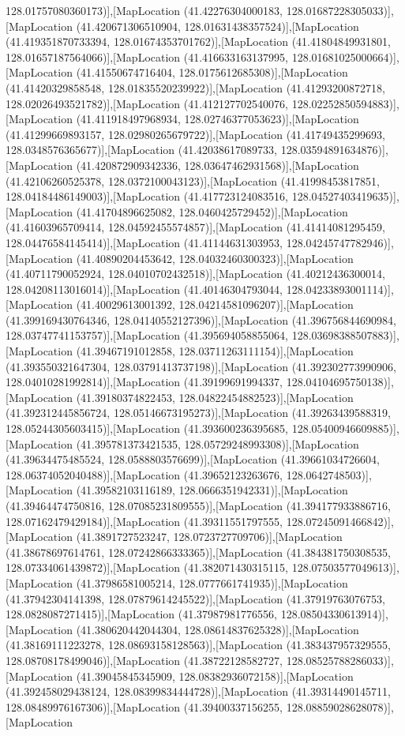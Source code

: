 128.01757080360173)],[MapLocation (41.42276304000183, 128.01687228305033)],[MapLocation (41.420671306510904, 128.01631438357524)],[MapLocation (41.419351870733394, 128.01674353701762)],[MapLocation (41.41804849931801, 128.01657187564066)],[MapLocation (41.416633163137995, 128.01681025000664)],[MapLocation (41.41550674716404, 128.0175612685308)],[MapLocation (41.41420329858548, 128.01835520239922)],[MapLocation (41.41293200872718, 128.02026493521782)],[MapLocation (41.412127702540076, 128.02252850594883)],[MapLocation (41.411918497968934, 128.02746377053623)],[MapLocation (41.41299669893157, 128.02980265679722)],[MapLocation (41.41749435299693, 128.0348576365677)],[MapLocation (41.42038617089733, 128.03594891634876)],[MapLocation (41.420872909342336, 128.03647462931568)],[MapLocation (41.42106260525378, 128.0372100043123)],[MapLocation (41.41998453817851, 128.04184486149003)],[MapLocation (41.417723124083516, 128.04527403419635)],[MapLocation (41.41704896625082, 128.0460425729452)],[MapLocation (41.41603965709414, 128.04592455574857)],[MapLocation (41.41414081295459, 128.04476584145414)],[MapLocation (41.41144631303953, 128.04245747782946)],[MapLocation (41.40890204453642, 128.04032460300323)],[MapLocation (41.40711790052924, 128.04010702432518)],[MapLocation (41.40212436300014, 128.04208113016014)],[MapLocation (41.40146304793044, 128.04233893001114)],[MapLocation (41.40029613001392, 128.04214581096207)],[MapLocation (41.399169430764346, 128.04140552127396)],[MapLocation (41.396756844690984, 128.03747741153757)],[MapLocation (41.395694058855064, 128.03698388507883)],[MapLocation (41.39467191012858, 128.03711263111154)],[MapLocation (41.393550321647304, 128.03791413737198)],[MapLocation (41.392302773990906, 128.04010281992814)],[MapLocation (41.39199691994337, 128.04104695750138)],[MapLocation (41.39180374822453, 128.04822454882523)],[MapLocation (41.392312445856724, 128.05146673195273)],[MapLocation (41.39263439588319, 128.05244305603415)],[MapLocation (41.393600236395685, 128.05400946609885)],[MapLocation (41.395781373421535, 128.05729248993308)],[MapLocation (41.39634475485524, 128.0588803576699)],[MapLocation (41.39661034726604, 128.06374052040488)],[MapLocation (41.39652123263676, 128.0642748503)],[MapLocation (41.39582103116189, 128.0666351942331)],[MapLocation (41.39464474750816, 128.07085231809555)],[MapLocation (41.394177933886716, 128.07162479429184)],[MapLocation (41.39311551797555, 128.07245091466842)],[MapLocation (41.3891727523247, 128.0723727709706)],[MapLocation (41.38678697614761, 128.07242866333365)],[MapLocation (41.384381750308535, 128.07334061439872)],[MapLocation (41.382071430315115, 128.07503577049613)],[MapLocation (41.37986581005214, 128.0777661741935)],[MapLocation (41.37942304141398, 128.07879614245522)],[MapLocation (41.37919763076753, 128.0828087271415)],[MapLocation (41.37987981776556, 128.08504330613914)],[MapLocation (41.380620442044304, 128.08614837625328)],[MapLocation (41.38169111223278, 128.08693158128563)],[MapLocation (41.383437957329555, 128.08708178499046)],[MapLocation (41.38722128582727, 128.08525788286033)],[MapLocation (41.39045845345909, 128.08382936072158)],[MapLocation (41.392458029438124, 128.08399834444728)],[MapLocation (41.39314490145711, 128.08489976167306)],[MapLocation (41.39400337156255, 128.08859028628078)],[MapLocation 